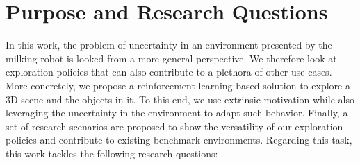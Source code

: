 

\section{Purpose and Research Questions}\label{chap:1:research-question}
In this work, the problem of uncertainty in an environment presented by the milking robot is looked from a more general perspective. We therefore look at exploration policies that can also contribute to a plethora of other use cases. More concretely, we propose a reinforcement learning based solution to explore a 3D scene and the objects in it. To this end, we use extrinsic motivation while also leveraging the uncertainty in the environment to adapt such behavior.
Finally, a set of research scenarios are proposed to show the versatility of our exploration policies and contribute to existing benchmark environments. 
Regarding this task, this work tackles the following research questions:


